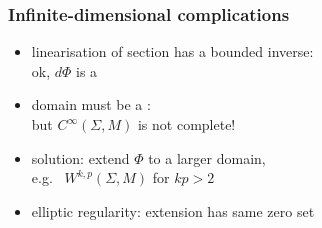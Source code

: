 \begin{frame}
  \frametitle{Infinite-dimensional complications}
  \begin{itemize}
    \item linearisation of section has a bounded inverse:\\ok, $d\Phi$ is a \pause

    \item domain must be a :\\
    but $C^\infty(\Sigma,M)$ is not complete!
    \item solution: extend $\Phi$ to a larger domain,\\
    e.g.\  $W^{k,p}(\Sigma,M)$ for $kp>2$
    \item elliptic regularity: extension has same zero set
  \end{itemize}
\end{frame}

